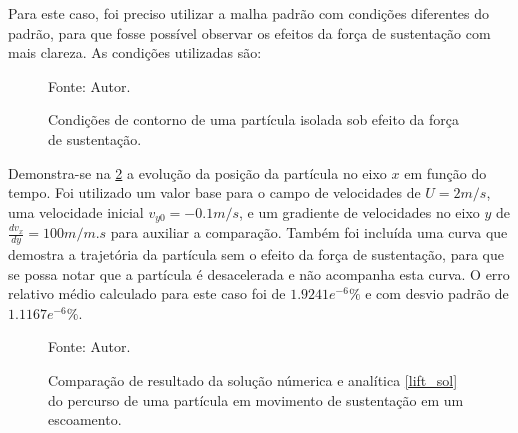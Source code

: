 Para este caso, foi preciso utilizar a malha padrão com condições diferentes do padrão, para que fosse possível observar os efeitos da força de sustentação com mais clareza.
As condições utilizadas são:
\begin{figure}[H]
    \centering
     {\raggedleft \scriptsize Fonte: Autor.}
    \caption{Condições de contorno de uma partícula isolada sob efeito da força de sustentação.}
    \label{lift_bc}
\end{figure}

Demonstra-se na \ref{lift_comp} a evolução da posição da partícula no eixo $x$ em função do tempo.
Foi utilizado um valor base para o campo de velocidades de $U=2m/s$, uma velocidade inicial $v_{y0}=-0.1m/s$, e um gradiente de velocidades no eixo $y$ de $\tfrac{dv_x}{dy}=100m/m.s$ para auxiliar a comparação.
Também foi incluída uma curva que demostra a trajetória da partícula sem o efeito da força de sustentação, para que se possa notar que a partícula é desacelerada e não acompanha esta curva.
O erro relativo médio calculado para este caso foi de $1.9241e^{-6}\%$ e com desvio padrão de $1.1167e^{-6}\%$.
\begin{figure}[H]
    \centering
     {\raggedleft \scriptsize Fonte: Autor.}
    \caption{Comparação de resultado da solução númerica e analítica \ref{lift_sol} do percurso de uma partícula em movimento de sustentação em um escoamento.}
    \label{lift_comp}
\end{figure}

